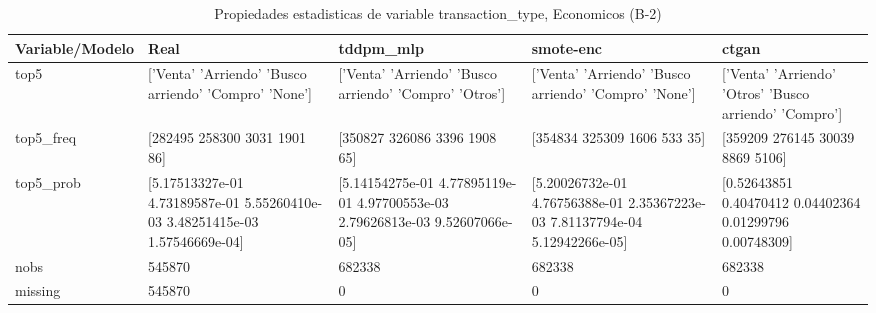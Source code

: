 \begin{table}[H]
\centering
\fontsize{8}{14}\selectfont
\caption{Propiedades  estadisticas de variable transaction\_type, Economicos (B-2)}
\label{table-stats-economicos-b-2-transaction_type}
\begin{tabular}{|l|m{10em}|m{10em}|m{10em}|m{10em}|}
\hline
 \rowcolor[gray]{0.8}
Variable/Modelo & Real & tddpm\_mlp & smote-enc & ctgan \\
\hline top5 & ['Venta' 'Arriendo' 'Busco arriendo' 'Compro' 'None'] & ['Venta' 'Arriendo' 'Busco arriendo' 'Compro' 'Otros'] & ['Venta' 'Arriendo' 'Busco arriendo' 'Compro' 'None'] & ['Venta' 'Arriendo' 'Otros' 'Busco arriendo' 'Compro'] \\
\hline top5\_freq & [282495 258300   3031   1901     86] & [350827 326086   3396   1908     65] & [354834 325309   1606    533     35] & [359209 276145  30039   8869   5106] \\
\hline top5\_prob & [5.17513327e-01 4.73189587e-01 5.55260410e-03 3.48251415e-03
 1.57546669e-04] & [5.14154275e-01 4.77895119e-01 4.97700553e-03 2.79626813e-03
 9.52607066e-05] & [5.20026732e-01 4.76756388e-01 2.35367223e-03 7.81137794e-04
 5.12942266e-05] & [0.52643851 0.40470412 0.04402364 0.01299796 0.00748309] \\
\hline nobs & 545870 & 682338 & 682338 & 682338 \\
\hline missing & 545870 & 0 & 0 & 0 \\
\hline
\end{tabular}
\end{table}
